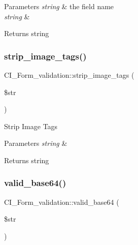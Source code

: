 \begin{DoxyParams}{Parameters}
{\em string} & the field name \\
\hline
{\em string} & \\
\hline
\end{DoxyParams}
\begin{DoxyReturn}{Returns}
string 
\end{DoxyReturn}
\mbox{\label{class_c_i___form__validation_abc608a4227bcdbc848a4c4d80c0d25cb}} 
\subsubsection{\texorpdfstring{strip\+\_\+image\+\_\+tags()}{strip\_image\_tags()}}
{\footnotesize\ttfamily C\+I\+\_\+\+Form\+\_\+validation\+::strip\+\_\+image\+\_\+tags (\begin{DoxyParamCaption}\item[{}]{\$str }\end{DoxyParamCaption})}

Strip Image Tags


\begin{DoxyParams}{Parameters}
{\em string} & \\
\hline
\end{DoxyParams}
\begin{DoxyReturn}{Returns}
string 
\end{DoxyReturn}
\mbox{\label{class_c_i___form__validation_aea165d42a23db72aa6fe386715450356}} 
\subsubsection{\texorpdfstring{valid\+\_\+base64()}{valid\_base64()}}
{\footnotesize\ttfamily C\+I\+\_\+\+Form\+\_\+validation\+::valid\+\_\+base64 (\begin{DoxyParamCaption}\item[{}]{\$str }\end{DoxyParamCaption})}

